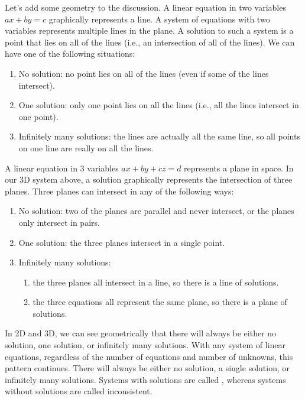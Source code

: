 Let's add some geometry to the discussion. 
A linear equation in two variables $ax+by=c$ graphically represents a line.  
A system of equations with two variables represents multiple lines in the plane. 
A solution to such a system is a point that lies on all of the lines
(i.e., an intersection of all of the lines).
We can have one of the following situations:
\begin{enumerate}
\item No solution: no point lies on all of the lines (even if some of
  the lines intersect).
\item One solution: only one point lies on all the lines (i.e., all
  the lines intersect in one point).
\item Infinitely many solutions: the lines are actually all the same
  line, so all points on one line are really on all the lines.
\end{enumerate}

A linear equation in 3 variables $ax+by+cz=d$ represents a plane in space.  
In our 3D system above, a solution graphically represents the intersection of three planes. 
Three planes can intersect in any of the following ways:
\begin{enumerate}
\item No solution: two of the planes are parallel and never intersect,
  or the planes only intersect in pairs.
\item One solution: the three planes intersect in a single point.
\item Infinitely many solutions:
\begin{enumerate}
	\item the three planes all intersect in a line, so there is a line of solutions.
	\item the three equations all represent the same plane, so there is a plane of solutions.
\end{enumerate}
\end{enumerate}
%
In 2D and 3D, we can see geometrically that there will always be either
no solution, one solution, or infinitely many solutions.
With any system of linear equations, regardless of the number of equations and number of unknowns, this pattern continues. 
There will always be either no solution, a single solution, or infinitely many solutions.
Systems with solutions are called ,
whereas systems without solutions are called inconsistent.

